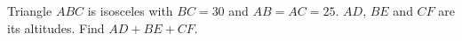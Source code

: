 Triangle $ABC$ is isosceles with $BC=30$ and $AB=AC=25$. $AD$, $BE$ and $CF$ are its altitudes. Find $AD+BE+CF$.
